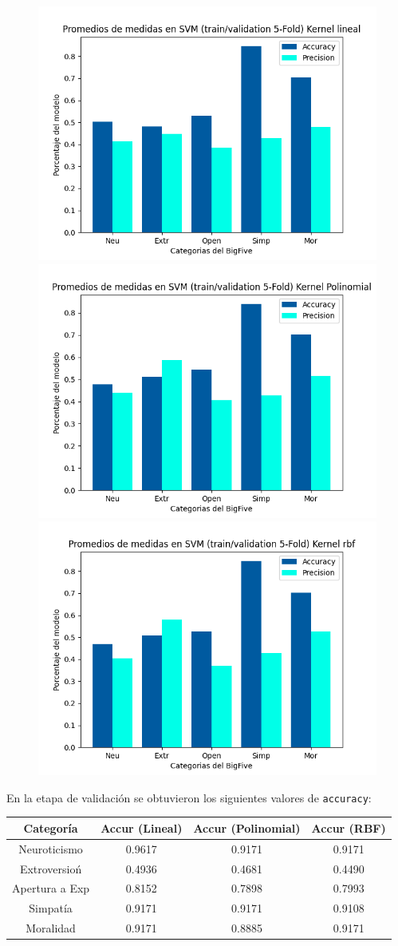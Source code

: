 \documentclass[10pt, a4paper]{article}
\begin{document}
            \begin{figure}[h!]
                \centering
                \includegraphics[width = 0.3\linewidth]{Medias_Lineal.png}
                \includegraphics[width = 0.3\linewidth]{Medias_Polinomial.png}
                \includegraphics[width = 0.3\linewidth]{Medias_rbf.png}

            \end{figure}

            En la etapa de validaci\'on se obtuvieron los siguientes valores de \texttt{accuracy}: \\ 

            \begin{tabular}[h!]{|c|c|c|c|}

                \hline Categor\'ia & Accur (Lineal) & Accur (Polinomial) & Accur (RBF) \\  
                \hline Neuroticismo             & 0.9617 & 0.9171  &  0.9171\\
                \hline Extroversio\'n           & 0.4936 & 0.4681  &  0.4490\\
                \hline Apertura a Exp           & 0.8152 & 0.7898  &  0.7993\\
                \hline Simpat\'ia               & 0.9171 & 0.9171  &  0.9108\\
                \hline Moralidad                & 0.9171 & 0.8885  &  0.9171\\
                \hline
            \end{tabular}
\end{document}
